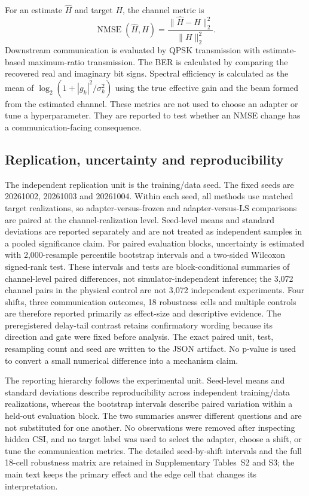 \documentclass[10pt,twocolumn]{article}
\begin{document}
For an estimate $\widehat H$ and target $H$, the channel metric is
\begin{equation}
 \operatorname{NMSE}(\widehat H,H)=\frac{\|\widehat H-H\|_2^2}{\|H\|_2^2}.
\end{equation}
Downstream communication is evaluated by QPSK transmission with estimate-based maximum-ratio transmission. The BER is calculated by comparing the recovered real and imaginary bit signs. Spectral efficiency is calculated as the mean of $\log_2(1+|g_k|^2/\sigma_k^2)$ using the true effective gain and the beam formed from the estimated channel. These metrics are not used to choose an adapter or tune a hyperparameter. They are reported to test whether an NMSE change has a communication-facing consequence.

\subsection{Replication, uncertainty and reproducibility}

The independent replication unit is the training/data seed. The fixed seeds are 20261002, 20261003 and 20261004. Within each seed, all methods use matched target realizations, so adapter-versus-frozen and adapter-versus-LS comparisons are paired at the channel-realization level. Seed-level means and standard deviations are reported separately and are not treated as independent samples in a pooled significance claim. For paired evaluation blocks, uncertainty is estimated with 2,000-resample percentile bootstrap intervals and a two-sided Wilcoxon signed-rank test. These intervals and tests are block-conditional summaries of channel-level paired differences, not simulator-independent inference; the 3,072 channel pairs in the physical control are not 3,072 independent experiments. Four shifts, three communication outcomes, 18 robustness cells and multiple controls are therefore reported primarily as effect-size and descriptive evidence. The preregistered delay-tail contrast retains confirmatory wording because its direction and gate were fixed before analysis. The exact paired unit, test, resampling count and seed are written to the JSON artifact. No p-value is used to convert a small numerical difference into a mechanism claim.

The reporting hierarchy follows the experimental unit. Seed-level means and standard deviations describe reproducibility across independent training/data realizations, whereas the bootstrap intervals describe paired variation within a held-out evaluation block. The two summaries answer different questions and are not substituted for one another. No observations were removed after inspecting hidden CSI, and no target label was used to select the adapter, choose a shift, or tune the communication metrics. The detailed seed-by-shift intervals and the full 18-cell robustness matrix are retained in Supplementary Tables~S2 and S3; the main text keeps the primary effect and the edge cell that changes its interpretation.
\end{document}
